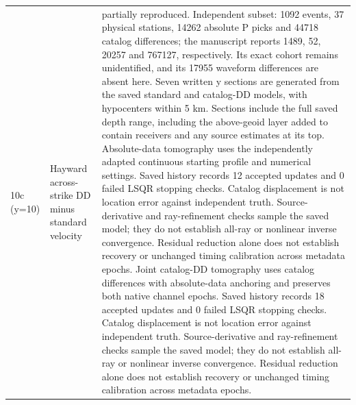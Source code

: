 \begin{longtable}{>{\raggedright\arraybackslash}p{}>{\raggedright\arraybackslash}p{}>{\raggedright\arraybackslash}p{}}
10c (y=10) & Hayward across-strike DD minus standard velocity & partially reproduced. Independent subset: 1092 events, 37 physical stations, 14262 absolute P picks and 44718 catalog differences; the manuscript reports 1489, 52, 20257 and 767127, respectively. Its exact cohort remains unidentified, and its 17955 waveform differences are absent here. Seven written y sections are generated from the saved standard and catalog-DD models, with hypocenters within 5 km. Sections include the full saved depth range, including the above-geoid layer added to contain receivers and any source estimates at its top. Absolute-data tomography uses the independently adapted continuous starting profile and numerical settings. Saved history records 12 accepted updates and 0 failed LSQR stopping checks. Catalog displacement is not location error against independent truth. Source-derivative and ray-refinement checks sample the saved model; they do not establish all-ray or nonlinear inverse convergence. Residual reduction alone does not establish recovery or unchanged timing calibration across metadata epochs. Joint catalog-DD tomography uses catalog differences with absolute-data anchoring and preserves both native channel epochs. Saved history records 18 accepted updates and 0 failed LSQR stopping checks. Catalog displacement is not location error against independent truth. Source-derivative and ray-refinement checks sample the saved model; they do not establish all-ray or nonlinear inverse convergence. Residual reduction alone does not establish recovery or unchanged timing calibration across metadata epochs.\\

\end{longtable}
